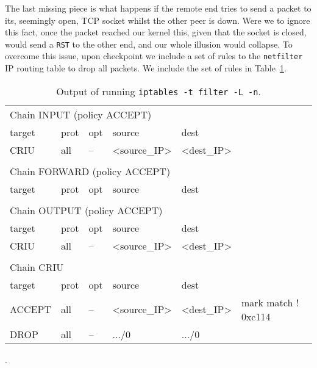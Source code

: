 The last missing piece is what happens if the remote end tries to send a packet
to its, seemingly open, TCP socket whilst the other peer is down.
Were we to ignore this fact, once the packet reached our kernel this, given
that the socket is closed, would send a \texttt{RST} to the other end, and our
whole illusion would collapse.
To overcome this issue, upon checkpoint we include a set of rules to the
\texttt{netfilter}~\cite{netfilter} IP routing table to drop all packets.
We include the set of rules in Table~\ref{table:iptables-rules}.
\begin{table}[h!]
    \centering
    {\ttfamily
        \begin{tabular}
            {p{3cm}p{1cm}p{1cm}p{2.5cm}p{2.5cm}p{5.0cm}}
            \multicolumn{6}{l}{Chain INPUT (policy ACCEPT)}
            \\[3pt]
            target & prot & opt & source       & dest       &
            \\[3pt]
            CRIU   & all  & --  & <source\_IP> & <dest\_IP> &
            \\[3pt]
                   &      &     &              &            &
            \\[3pt]
            \multicolumn{6}{l}{Chain FORWARD (policy ACCEPT)}
            \\[3pt]
            target & prot & opt & source       & dest       &
            \\[3pt]
                   &      &     &              &            &
            \\[3pt]
            \multicolumn{6}{l}{Chain OUTPUT (policy ACCEPT)}
            \\[3pt]
            target & prot & opt & source       & dest       &
            \\[3pt]
            CRIU   & all  & --  & <source\_IP> & <dest\_IP> &
            \\[3pt]
                   &      &     &              &            &
            \\[3pt]
            \multicolumn{6}{l}{Chain CRIU}
            \\[3pt]
            target & prot & opt & source       & dest       &
            \\[3pt]
            ACCEPT & all  & --  & <source\_IP> & <dest\_IP> & mark match !
            0xc114
            \\[3pt]
            DROP   & all  & --  & .../0        & .../0      &
            \\[3pt]
        \end{tabular}
    }
    \caption{Output of running \texttt{iptables -t filter -L
            -n}.\label{table:iptables-rules}}.
\end{table}


